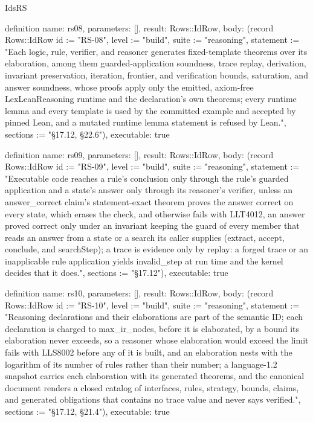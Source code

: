 \begin{lexlean}{IdsRS}
\begin{semanticmodule}
definition{
  name: rs08,
  parameters: [],
  result: Rows::IdRow,
  body: (record Rows::IdRow {id := "RS-08", level := "build", suite := "reasoning", statement := "Each logic, rule, verifier, and reasoner generates fixed-template theorems over its elaboration, among them guarded-application soundness, trace replay, derivation, invariant preservation, iteration, frontier, and verification bounds, saturation, and answer soundness, whose proofs apply only the emitted, axiom-free LexLeanReasoning runtime and the declaration's own theorems; every runtime lemma and every template is used by the committed example and accepted by pinned Lean, and a mutated runtime lemma statement is refused by Lean.", sections := "§17.12, §22.6"}),
  executable: true
}

definition{
  name: rs09,
  parameters: [],
  result: Rows::IdRow,
  body: (record Rows::IdRow {id := "RS-09", level := "build", suite := "reasoning", statement := "Executable code reaches a rule's conclusion only through the rule's guarded application and a state's answer only through its reasoner's verifier, unless an answer_correct claim's statement-exact theorem proves the answer correct on every state, which erases the check, and otherwise fails with LLT4012, an answer proved correct only under an invariant keeping the guard of every member that reads an answer from a state or a search its caller supplies (extract, accept, conclude, and searchStep); a trace is evidence only by replay: a forged trace or an inapplicable rule application yields invalid_step at run time and the kernel decides that it does.", sections := "§17.12"}),
  executable: true
}

definition{
  name: rs10,
  parameters: [],
  result: Rows::IdRow,
  body: (record Rows::IdRow {id := "RS-10", level := "build", suite := "reasoning", statement := "Reasoning declarations and their elaborations are part of the semantic ID; each declaration is charged to max_ir_nodes, before it is elaborated, by a bound its elaboration never exceeds, so a reasoner whose elaboration would exceed the limit fails with LLS8002 before any of it is built, and an elaboration nests with the logarithm of its number of rules rather than their number; a language-1.2 snapshot carries each elaboration with its generated theorems, and the canonical document renders a closed catalog of interfaces, rules, strategy, bounds, claims, and generated obligations that contains no trace value and never says verified.", sections := "§17.12, §21.4"}),
  executable: true
}


\end{semanticmodule}
\end{lexlean}
